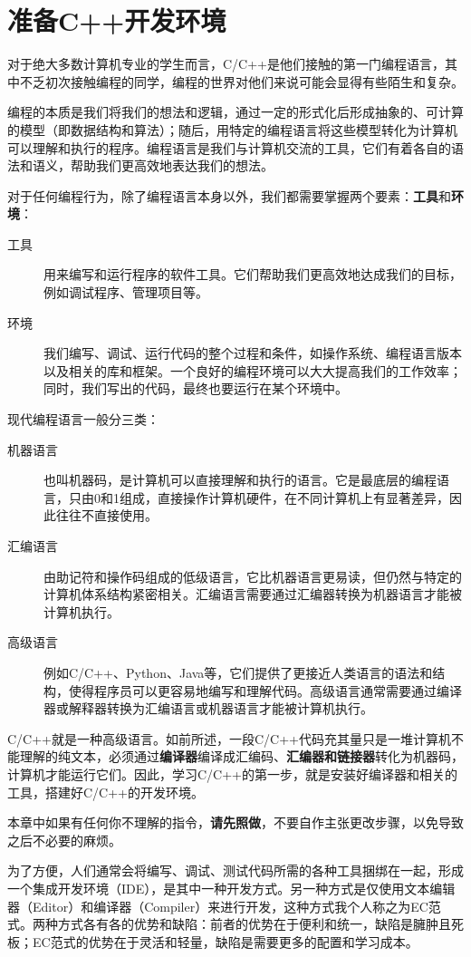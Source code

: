 \chapter{准备C++开发环境}

对于绝大多数计算机专业的学生而言，C/C++是他们接触的第一门编程语言，其中不乏初次接触编程的同学，编程的世界对他们来说可能会显得有些陌生和复杂。

编程的本质是我们将我们的想法和逻辑，通过一定的形式化后形成抽象的、可计算的模型（即数据结构和算法）；随后，用特定的编程语言将这些模型转化为计算机可以理解和执行的程序。编程语言是我们与计算机交流的工具，它们有着各自的语法和语义，帮助我们更高效地表达我们的想法。

对于任何编程行为，除了编程语言本身以外，我们都需要掌握两个要素：\textbf{工具}和\textbf{环境}：
\begin{description}
    \item[工具] 用来编写和运行程序的软件工具。它们帮助我们更高效地达成我们的目标，例如调试程序、管理项目等。
    \item[环境] 我们编写、调试、运行代码的整个过程和条件，如操作系统、编程语言版本以及相关的库和框架。一个良好的编程环境可以大大提高我们的工作效率；同时，我们写出的代码，最终也要运行在某个环境中。
\end{description}

现代编程语言一般分三类：
\begin{description}
    \item[机器语言] 也叫机器码，是计算机可以直接理解和执行的语言。它是最底层的编程语言，只由0和1组成，直接操作计算机硬件，在不同计算机上有显著差异，因此往往不直接使用。
    \item[汇编语言] 由助记符和操作码组成的低级语言，它比机器语言更易读，但仍然与特定的计算机体系结构紧密相关。汇编语言需要通过汇编器转换为机器语言才能被计算机执行。
    \item[高级语言] 例如C/C++、Python、Java等，它们提供了更接近人类语言的语法和结构，使得程序员可以更容易地编写和理解代码。高级语言通常需要通过编译器或解释器转换为汇编语言或机器语言才能被计算机执行。
\end{description}
C/C++就是一种高级语言。如前所述，一段C/C++代码充其量只是一堆计算机不能理解的纯文本，必须通过\textbf{编译器}编译成汇编码、\textbf{汇编器和链接器}转化为机器码，计算机才能运行它们。因此，学习C/C++的第一步，就是安装好编译器和相关的工具，搭建好C/C++的开发环境。

本章中如果有任何你不理解的指令，\textbf{请先照做}，不要自作主张更改步骤，以免导致之后不必要的麻烦。

为了方便，人们通常会将编写、调试、测试代码所需的各种工具捆绑在一起，形成一个集成开发环境（IDE），是其中一种开发方式。另一种方式是仅使用文本编辑器（Editor）和编译器（Compiler）来进行开发，这种方式我个人称之为EC范式。两种方式各有各的优势和缺陷：前者的优势在于便利和统一，缺陷是臃肿且死板；EC范式的优势在于灵活和轻量，缺陷是需要更多的配置和学习成本。

